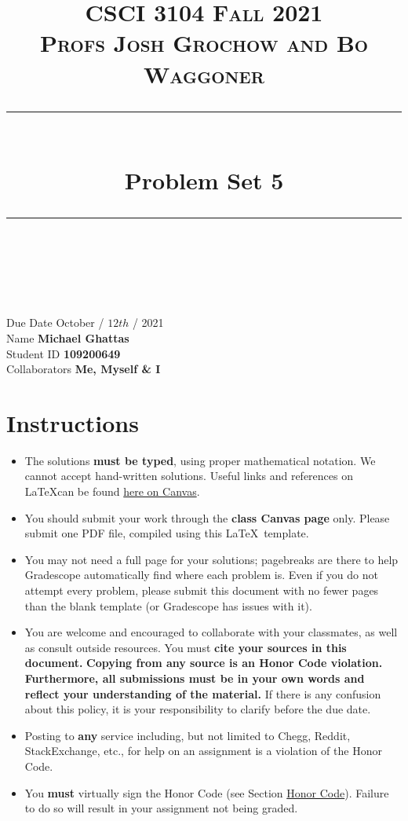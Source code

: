 \documentclass[11pt]{article}
\title{
\normalfont \normalsize 
\textsc{CSCI 3104 Fall 2021 \\ 
Profs Josh Grochow and Bo Waggoner} \\
[10pt] 
\rule{\linewidth}{0.5pt} \\[6pt] 
\huge Problem Set 5 \\
\rule{\linewidth}{2pt}  \\[10pt]
}
\date{}
\theoremstyle{definition}
\theoremstyle{definition}
\theoremstyle{definition}
\begin{document}
\maketitle


\noindent
Due Date \dotfill October / $12{th}$ / 2021 \\
Name \dotfill \textbf{Michael Ghattas} \\
Student ID \dotfill \textbf{109200649} \\
Collaborators \dotfill \textbf{Me, Myself \& I}

\tableofcontents

\section*{Instructions}
 \begin{itemize}
	\item The solutions \textbf{must be typed}, using proper mathematical notation. We cannot accept hand-written solutions. Useful links and references on \LaTeX can be found \href{https://canvas.colorado.edu/courses/75824/pages/latex}{here on Canvas}.
	\item You should submit your work through the \textbf{class Canvas page} only. Please submit one PDF file, compiled using this \LaTeX \ template.
	\item You may not need a full page for your solutions; pagebreaks are there to help Gradescope automatically find where each problem is. Even if you do not attempt every problem, please submit this document with no fewer pages than the blank template (or Gradescope has issues with it).

	\item You are welcome and encouraged to collaborate with your classmates, as well as consult outside resources. You must \textbf{cite your sources in this document.} \textbf{Copying from any source is an Honor Code violation. Furthermore, all submissions must be in your own words and reflect your understanding of the material.} If there is any confusion about this policy, it is your responsibility to clarify before the due date. 

	\item Posting to \textbf{any} service including, but not limited to Chegg, Reddit, StackExchange, etc., for help on an assignment is a violation of the Honor Code.

	\item You \textbf{must} virtually sign the Honor Code (see Section \hyperlink{HonorCode}{Honor Code}). Failure to do so will result in your assignment not being graded.
\end{itemize}
\end{document}
